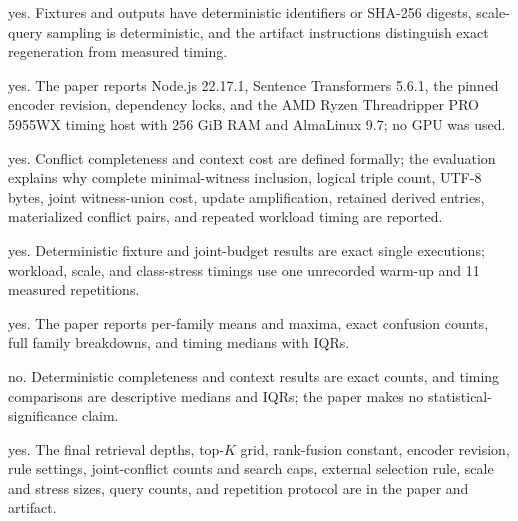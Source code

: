 \documentclass[letterpaper]{article}
\begin{document}
\begin{itemize}
\begin{itemize}
		yes. Fixtures and outputs have deterministic identifiers or SHA-256
		digests, scale-query sampling is deterministic, and the artifact
		instructions distinguish exact regeneration from measured timing.

		yes. The paper reports Node.js 22.17.1, Sentence Transformers 5.6.1,
		the pinned encoder revision, dependency locks, and the AMD Ryzen
		Threadripper PRO 5955WX timing host with 256 GiB RAM and AlmaLinux 9.7;
		no GPU was used.

		yes. Conflict completeness and context cost are defined formally; the
		evaluation explains why complete minimal-witness inclusion, logical
		triple count, UTF-8 bytes, joint witness-union cost, update amplification,
		retained derived entries, materialized conflict pairs, and repeated
		workload timing are reported.

		yes. Deterministic fixture and joint-budget results are exact single
		executions; workload, scale, and class-stress timings use one unrecorded
		warm-up and 11 measured repetitions.

		yes. The paper reports per-family means and maxima, exact confusion
		counts, full family breakdowns, and timing medians with IQRs.

		no. Deterministic completeness and context results are exact counts, and
		timing comparisons are descriptive medians and IQRs; the paper makes no
		statistical-significance claim.

		yes. The final retrieval depths, top-$K$ grid, rank-fusion constant,
		encoder revision, rule settings, joint-conflict counts and search caps,
		external selection rule, scale and stress sizes, query counts, and
		repetition protocol are in the paper and artifact.


\end{itemize}
\end{itemize}
\ifreproStandalone
\let\reproEndDocument\enddocument
\else
\let\reproEndDocument\relax
\fi
\reproEndDocument
\end{document}
